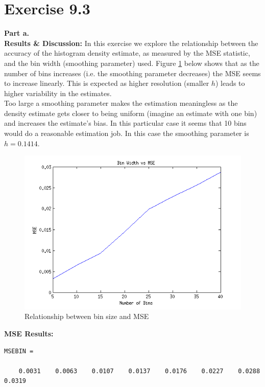 \documentclass[12pt,a4paper]{article}
\begin{document}
\clearpage

\section*{Exercise 9.3}
\textbf{Part a.}\\
\textbf{Results \& Discussion: } In this exercise we explore the relationship between the accuracy of the histogram density estimate, as measured by the MSE statistic, and the bin width (smoothing parameter) used. Figure \ref{q3 fig1} below shows that as the number of bins increases (i.e. the smoothing parameter decreases) the MSE seems to increase linearly. This is expected as higher resolution (smaller $h$) leads to higher variability in the estimates.\\

Too large a smoothing parameter makes the estimation meaningless as the density estimate gets closer to being uniform (imagine an estimate with one bin) and increases the estimate's bias. In this particular case it seems that 10 bins would do a reasonable estimation job. In this case the smoothing parameter is $h=0.1414$. 

\begin{figure}[ht!] 
\begin{center}
\includegraphics[scale=.86]{q9p3a_graph.png}
\caption{Relationship between bin size and MSE}
\label{q3 fig1}
\end{center}
\end{figure}
\FloatBarrier

\textbf{MSE Results:}
\begin{verbatim}
MSEBIN =

    0.0031    0.0063    0.0107    0.0137    0.0176    0.0227    0.0288    0.0319
\end{verbatim}
\end{document}
